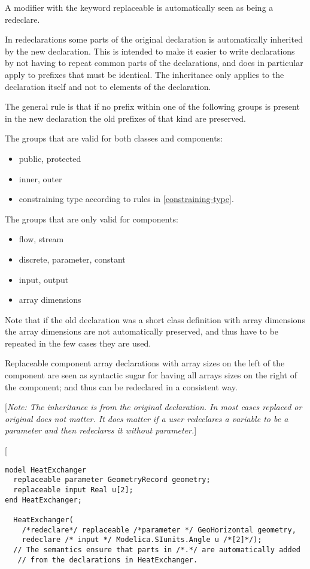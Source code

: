 A modifier with the keyword replaceable is automatically seen as being a
redeclare.

In redeclarations some parts of the original declaration is
automatically inherited by the new declaration. This is intended to make
it easier to write declarations by not having to repeat common parts of
the declarations, and does in particular apply to prefixes that must be
identical. The inheritance only applies to the declaration itself and
not to elements of the declaration.

The general rule is that if no prefix within one of the following groups
is present in the new declaration the old prefixes of that kind are
preserved.

The groups that are valid for both classes and components:

\begin{itemize}
\item
  public, protected
\item
  inner, outer
\item
  constraining type according to rules in \ref{constraining-type}.
\end{itemize}

The groups that are only valid for components:

\begin{itemize}
\item
  flow, stream
\item
  discrete, parameter, constant
\item
  input, output
\item
  array dimensions
\end{itemize}

Note that if the old declaration was a short class definition with array
dimensions the array dimensions are not automatically preserved, and
thus have to be repeated in the few cases they are used.

Replaceable component array declarations with array sizes on the left of
the component are seen as syntactic sugar for having all arrays sizes on
the right of the component; and thus can be redeclared in a consistent
way.

{[}\emph{Note: The inheritance is from the original declaration. In most
cases replaced or original does not matter. It does matter if a user
redeclares a variable to be a parameter and then redeclares it without
parameter.}{]}

{[}
\begin{lstlisting}[language=modelica]
model HeatExchanger
  replaceable parameter GeometryRecord geometry;
  replaceable input Real u[2];
end HeatExchanger;

  HeatExchanger(
    /*redeclare*/ replaceable /*parameter */ GeoHorizontal geometry,
    redeclare /* input */ Modelica.SIunits.Angle u /*[2]*/);
  // The semantics ensure that parts in /*.*/ are automatically added
   // from the declarations in HeatExchanger.
\end{lstlisting}

